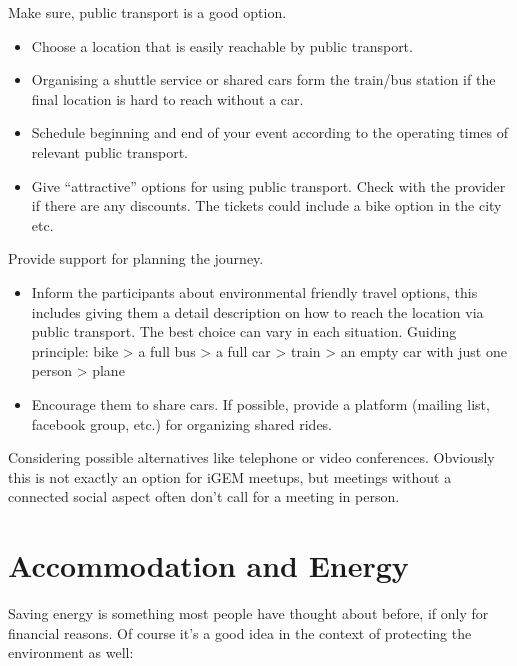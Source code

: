 \begin{suggest}{Make sure, public transport is a good option.}
	\vspace{-2\topsep}
	\begin{itemize}
		\item Choose a location that is easily reachable by public transport.
		\item Organising a shuttle service or shared cars form the train/bus station if the final location is hard to reach without a car.
		\item Schedule beginning and end of your event according to the operating times of relevant public transport.
		\item Give ``attractive'' options for using public transport. Check with the provider if there are any discounts. The tickets could include a bike option in the city etc.
	\end{itemize}
\end{suggest}
\clearpage
\begin{suggest}{Provide support for planning the journey.}
	\vspace{-2\topsep}
	\begin{itemize}
		\item Inform the participants about environmental friendly travel options, this includes giving them a detail description on how to reach the location via public transport. The best choice can vary in each situation. Guiding principle: bike > a full bus > a full car > train > an empty car with just one person > plane
		\item Encourage them to share cars. If possible, provide a platform (mailing list, facebook group, etc.) for organizing shared rides.
	\end{itemize}	
\end{suggest}

\begin{suggest}{Considering possible alternatives like telephone or video conferences.}
	Obviously this is not exactly an option for iGEM meetups, but meetings without a connected social aspect often don't call for a meeting in person.
\end{suggest}

\section{Accommodation and Energy}

Saving energy is something most people have thought about before, if only for financial reasons. Of course it's a good idea in the context of protecting the environment as well:

